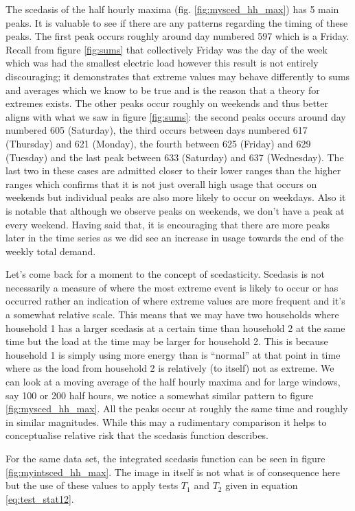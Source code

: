 The scedasis of the half hourly maxima (fig. \ref{fig:mysced_hh_max}) has 5 main peaks. It is valuable to see if there are any patterns regarding the timing of these peaks. The first peak occurs roughly around day numbered 597 which is a Friday. Recall from figure \ref{fig:sums} that collectively Friday was the day of the week which was had the smallest electric load however this result is not entirely discouraging; it demonstrates that extreme values may behave differently to sums and averages which we know to be true and is the reason that a theory for extremes exists. The other peaks occur roughly on weekends and thus better aligns with what we saw in figure \ref{fig:sums}: the second peaks occurs around day numbered 605 (Saturday), the third occurs between days numbered 617 (Thursday) and 621 (Monday), the fourth between 625 (Friday) and 629 (Tuesday) and the last peak between 633 (Saturday) and 637 (Wednesday). The last two in these cases are admitted closer to their lower ranges than the higher ranges which confirms that it is not just overall high usage that occurs on weekends but individual peaks are also more likely to occur on weekdays. Also it is notable that although we observe peaks on weekends, we don't have a peak at every weekend. Having said that, it is encouraging that there are more peaks later in the time series as we did see an increase in usage towards the end of the weekly total demand.

Let's come back for a moment to the concept of scedasticity. Scedasis is not necessarily a measure of where the most extreme event is likely to occur or has occurred rather an indication of where extreme values are more frequent and it's a somewhat relative scale. This means that we may have two households where household 1 has a larger scedasis at a certain time than household 2 at the same time but the load at the time may be larger for household 2. This is because household 1 is simply using more energy than is ``normal'' at that point in time where as the load from household 2 is relatively (to itself) not as extreme.%
We can look at a moving average of the half hourly maxima and for large windows, say 100 or 200 half hours, we notice a somewhat similar pattern to figure \ref{fig:mysced_hh_max}.  All the peaks occur at roughly the same time and roughly in similar magnitudes. While this may a rudimentary comparison it helps to conceptualise relative risk that the scedasis function describes.

For the same data set, the integrated scedasis function can be seen in figure \ref{fig:myintsced_hh_max}. The image in itself is not what is of consequence here but the use of these values to apply tests $T_1$ and $T_2$ given in equation \ref{eq:test_stat12}.

